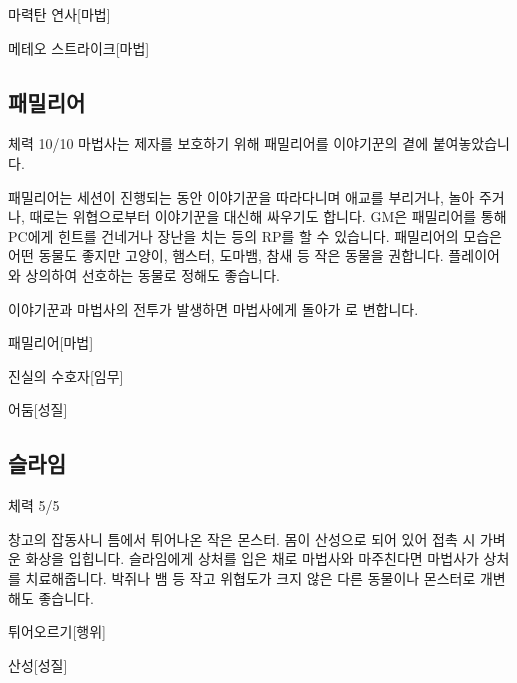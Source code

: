 \documentclass{report}
\begin{document}
		\begin{story}{마력탄 연사}{[마법]}
		\end{story}
		
		\begin{story}{메테오 스트라이크}{[마법]}
		\end{story}
	
	\subsection*{패밀리어}
		체력 10/10
		마법사는 제자를 보호하기 위해 패밀리어를 이야기꾼의 곁에 붙여놓았습니다.
		
		패밀리어는 세션이 진행되는 동안 이야기꾼을 따라다니며 애교를 부리거나, 놀아 주거나, 때로는 위협으로부터 이야기꾼을 대신해 싸우기도 합니다. GM은 패밀리어를 통해 PC에게 힌트를 건네거나 장난을 치는 등의 RP를 할 수 있습니다. 패밀리어의 모습은 어떤 동물도 좋지만 고양이, 햄스터, 도마뱀, 참새 등 작은 동물을 권합니다. 플레이어와 상의하여 선호하는 동물로 정해도 좋습니다.
		
		이야기꾼과 마법사의 전투가 발생하면 마법사에게 돌아가 로 변합니다.
		
		\begin{story}{패밀리어}{[마법]}
		\end{story}
		
		\begin{story}{진실의 수호자}{[임무]}
		\end{story}
		
		\begin{story}{어둠}{[성질]}
		\end{story}
	
	\subsection*{슬라임}
		체력 5/5
		
		창고의 잡동사니 틈에서 튀어나온 작은 몬스터. 몸이 산성으로 되어 있어 접촉 시 가벼운 화상을 입힙니다. 슬라임에게 상처를 입은 채로 마법사와 마주친다면 마법사가 상처를 치료해줍니다. 박쥐나 뱀 등 작고 위협도가 크지 않은 다른 동물이나 몬스터로 개변해도 좋습니다.
		
		\begin{story}{튀어오르기}{[행위]}
		\end{story}
		
		\begin{story}{산성}{[성질]}
		\end{story}
	
\end{document}
